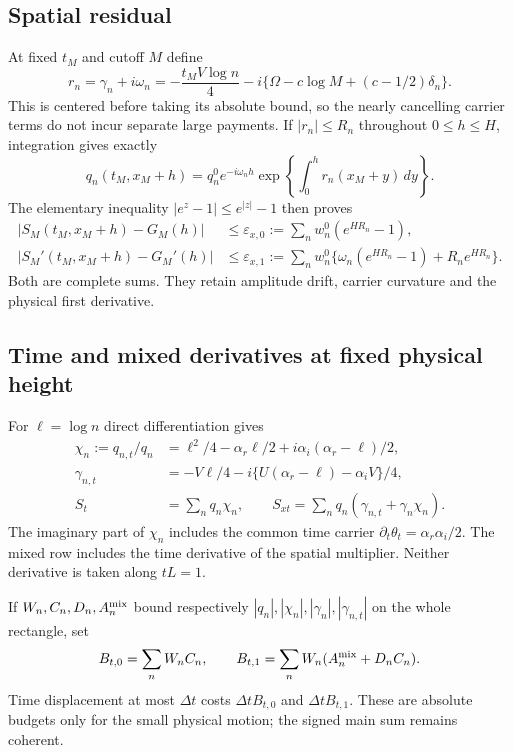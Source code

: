 \documentclass[11pt]{article}
\numberwithin{equation}{section}
\theoremstyle{definition}
\theoremstyle{remark}
\newcommand{\dd}{\,d}
\begin{document}
\subsection{Spatial residual}
At fixed $t_M$ and cutoff $M$ define
\begin{equation}
 r_n=\gamma_n+i\omega_n
 =-\frac{t_MV\log n}{4}
 -i\{\Omega-c\log M+(c-1/2)\delta_n\}.
 \label{eq:r}
\end{equation}
This is centered before taking its absolute bound, so the nearly
cancelling carrier terms do not incur separate large payments. If
$|r_n|\le R_n$ throughout $0\le h\le H$, integration gives exactly
\begin{equation}
 q_n(t_M,x_M+h)=q_n^0e^{-i\omega_nh}
                 \exp\left\{\int_0^h r_n(x_M+y)\dd y\right\}.
\end{equation}
The elementary inequality $|e^z-1|\le e^{|z|}-1$ then proves
\begin{align}
 |S_M(t_M,x_M+h)-G_M(h)|&\le\varepsilon_{x,0}
   :=\sum_nw_n^0(e^{HR_n}-1),\nonumber\\
 |S_M'(t_M,x_M+h)-G_M'(h)|&\le\varepsilon_{x,1}
   :=\sum_nw_n^0\{\omega_n(e^{HR_n}-1)+R_ne^{HR_n}\}.
 \label{eq:spatial-payment}
\end{align}
Both are complete sums. They retain amplitude drift, carrier
curvature and the physical first derivative.

\subsection{Time and mixed derivatives at fixed physical height}
For $\ell=\log n$ direct differentiation gives
\begin{align}
 \chi_n:=q_{n,t}/q_n
 &=\ell^2/4-\alpha_r\ell/2
                      +i\alpha_i(\alpha_r-\ell)/2,\nonumber\\
 \gamma_{n,t}&=-V\ell/4
       -i\{U(\alpha_r-\ell)-\alpha_iV\}/4,\label{eq:time-multipliers}\\
 S_t&=\sum_nq_n\chi_n,\qquad
 S_{xt}=\sum_nq_n(\gamma_{n,t}+\gamma_n\chi_n).\nonumber
\end{align}
The imaginary part of $\chi_n$ includes the common time carrier
$\partial_t\theta_t=\alpha_r\alpha_i/2$. The mixed row includes
the time derivative of the spatial multiplier. Neither derivative
is taken along $tL=1$.

If $W_n,C_n,D_n,A_n^{\rm mix}$ bound respectively
$|q_n|,|\chi_n|,|\gamma_n|,|\gamma_{n,t}|$ on the whole rectangle,
set
\begin{equation}
 B_{t,0}=\sum_nW_nC_n,\qquad
 B_{t,1}=\sum_nW_n(A_n^{\rm mix}+D_nC_n).
 \label{eq:time-payment}
\end{equation}
Time displacement at most $\Delta t$ costs
$\Delta t B_{t,0}$ and $\Delta t B_{t,1}$. These are absolute
budgets only for the small physical motion; the signed main sum remains
coherent.
\end{document}
